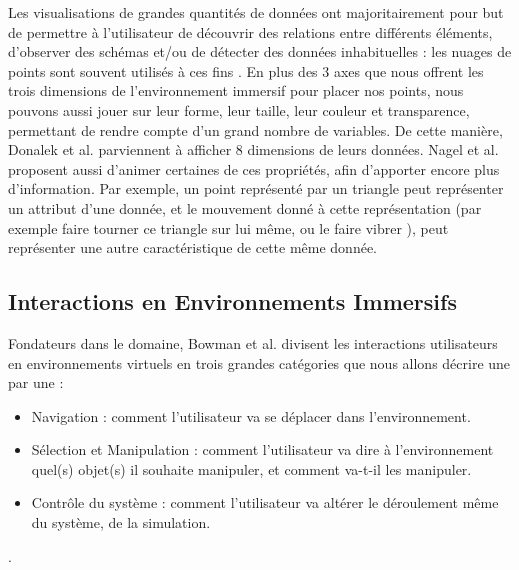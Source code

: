 	 Les visualisations de grandes quantités de données ont majoritairement pour but de permettre à l'utilisateur de découvrir des relations entre différents éléments, d'observer des schémas et/ou de détecter des données inhabituelles : les nuages de points sont souvent utilisés à ces fins \cite{nagel_methods_2001}.
	En plus des 3 axes que nous offrent les trois dimensions de l'environnement immersif pour placer nos points, nous pouvons aussi jouer sur leur forme, leur taille, leur couleur et transparence, permettant de rendre compte d'un grand nombre de variables. De cette manière, Donalek et al. \cite{donalek_immersive_2014} parviennent à afficher 8 dimensions de leurs données. Nagel et al. \cite{nagel_methods_2001} proposent aussi d'animer certaines de ces propriétés, afin d'apporter encore plus d'information. Par exemple, un point représenté par un triangle peut représenter un attribut d'une donnée, et le mouvement donné à cette représentation (par exemple faire tourner ce triangle sur lui même, ou le faire vibrer ), peut représenter une autre caractéristique de cette même donnée.
	
	\subsection{Interactions en Environnements Immersifs}
	
	Fondateurs dans le domaine, Bowman et al. \cite{bowman_introduction_2001} divisent les interactions utilisateurs en environnements virtuels en trois grandes catégories que nous allons décrire une par une :
	\begin{itemize}
		\item Navigation : comment l'utilisateur va se déplacer dans l'environnement.
		\item Sélection et Manipulation : comment l'utilisateur va dire à l'environnement quel(s) objet(s) il souhaite manipuler, et comment va-t-il les manipuler.
		\item Contrôle du système : comment l'utilisateur va altérer le déroulement même du système, de la simulation.
	\end{itemize}.
	
